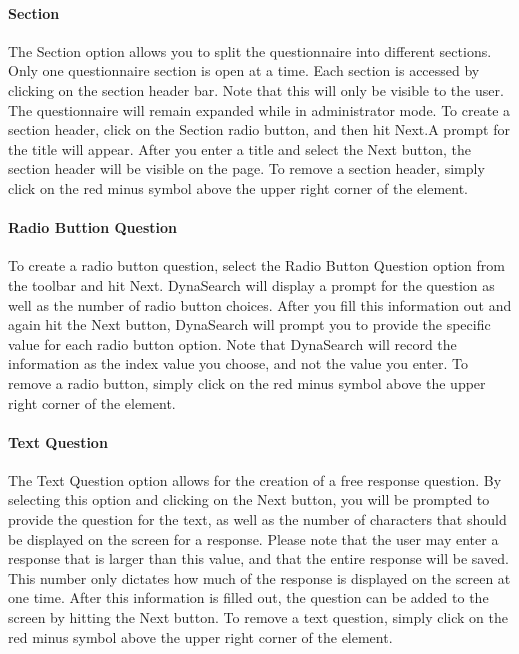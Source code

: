\documentclass[article]{ij4uq}              %
\begin{document}
\paragraph{Section}

The Section option allows you to split the questionnaire into different sections. Only one questionnaire section is open at a time. Each section is accessed by clicking on the section header bar. Note that this will only be visible to the user. The questionnaire will remain expanded while in administrator mode. 
To create a section header, click on the Section radio button, and then hit Next.A prompt for the title will appear. After you enter a title and select the Next button, the section header will be visible on the page. To remove a section header, simply click on the red minus symbol above the upper right corner of the element.

\paragraph{Radio Buttion Question}
To create a radio button question, select the Radio Button Question option from the toolbar and hit Next. DynaSearch will display a prompt for the question as well as the number of radio button choices. After you fill this information out and again hit the Next button, DynaSearch will prompt you to provide the specific value for each radio button option. 
Note that DynaSearch will record the information as the index value you choose, and not the value you enter. To remove a radio button, simply click on the red minus symbol above the upper right corner of the element.

\paragraph{Text Question}
The Text Question option allows for the creation of a free response question. By selecting this option and clicking on the Next button, you will be prompted to provide the question for the text, as well as the number of characters that should be displayed on the screen for a response. Please note that the user may enter a response that is larger than this value, and that the entire response will be saved. This number only dictates how much of the response is displayed on the screen at one time. 
After this information is filled out, the question can be added to the screen by hitting the Next button. To remove a text question, simply click on the red minus symbol above the upper right corner of the element.
\end{document}
